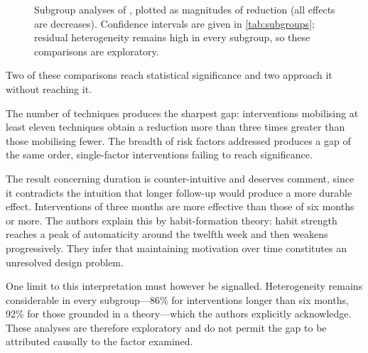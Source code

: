 \documentclass[12pt,a4paper,oneside]{report}
\begin{document}
\begin{figure}[htbp]
\centering
{}
\caption{Subgroup analyses of \textcite{zhou2024}, plotted as magnitudes of reduction (all effects are decreases). Confidence intervals are given in \cref{tab:subgroups}; residual heterogeneity remains high in every subgroup, so these comparisons are exploratory.}\label{fig:subgroups}
\end{figure}

Two of these comparisons reach statistical significance and two approach it without reaching it.

The number of techniques produces the sharpest gap: interventions mobilising at least eleven techniques obtain a reduction more than three times greater than those mobilising fewer. The breadth of risk factors addressed produces a gap of the same order, single-factor interventions failing to reach significance.

The result concerning duration is counter-intuitive and deserves comment, since it contradicts the intuition that longer follow-up would produce a more durable effect. Interventions of three months are more effective than those of six months or more. The authors explain this by habit-formation theory: habit strength reaches a peak of automaticity around the twelfth week and then weakens progressively. They infer that maintaining motivation over time constitutes an unresolved design problem.

One limit to this interpretation must however be signalled. Heterogeneity remains considerable in every subgroup---86\% for interventions longer than six months, 92\% for those grounded in a theory---which the authors explicitly acknowledge. These analyses are therefore exploratory and do not permit the gap to be attributed causally to the factor examined.
\end{document}
